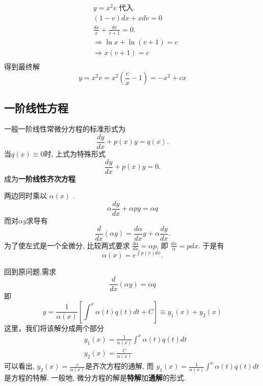 $$
\begin{aligned}
& y=x^2 v \text { 代入. } \\
& (1-v) d x+x d v=0 \\
& \frac{d x}{x}+\frac{d v}{v+1}=0 . \\
& \Rightarrow \ln x+\ln (v+1)=c \\
& \Rightarrow x(v+1)=c \\
\end{aligned}
$$
得到最终解
\[
    y=x^2 v=x^2\left(\frac{c}{x}-1\right) = -x^2+c x 
\]

\subsection{一阶线性方程}
一般一阶线性常微分方程的标准形式为
\begin{equation}
    \frac{d y}{d x}+p(x) y=q(x).
\end{equation}
当$q(x) \equiv 0$时, 上式为特殊形式
\begin{equation}
    \frac{d y}{d x}+p(x) y = 0.
\end{equation}
成为\textbf{一阶线性齐次方程}

两边同时乘以 $\alpha(x)$ .
\begin{equation}
     \alpha \frac{d y}{d x}+\alpha p y=\alpha q 
\end{equation}
而对$\alpha y$求导有
\begin{equation}
    \frac{d}{d x}(\alpha y)=\frac{d \alpha}{d x} y+\alpha \frac{d y}{d x} .
\end{equation}
为了使左式是一个全微分, 比较两式要求
$\frac{d \alpha}{d x}=\alpha p $, 即 $\frac{d \alpha}{\alpha}=p d x $. 于是有
\begin{equation}
    \alpha(x)=e^{\int p(x) d x}.
\end{equation}

回到原问题,需求
$$\frac{d}{d x}(\alpha y)=\alpha q $$
即
\begin{equation}
    y=\frac{1}{\alpha(x)}\left[\int^x \alpha(t) q(t) dt+C\right] \equiv y_1(x)+y_2(x)
\end{equation}
这里，我们将该解分成两个部分
\begin{equation}
\begin{aligned}
& y_1(x)=\frac{1}{\alpha(x)} \int^x \alpha(t) q(t) d t \\
& y_2(x)=\frac{C}{\alpha(x)}
\end{aligned}
\end{equation}
可以看出, $y_2(x)=\frac{c}{\alpha(x)}$是齐次方程的通解,
而 $y_1(x)=\frac{1}{\alpha(x)} \int^x \alpha(t) q(t) d t$是方程的特解.
一般地, 微分方程的解是\textbf{特解}加\textbf{通解}的形式.




